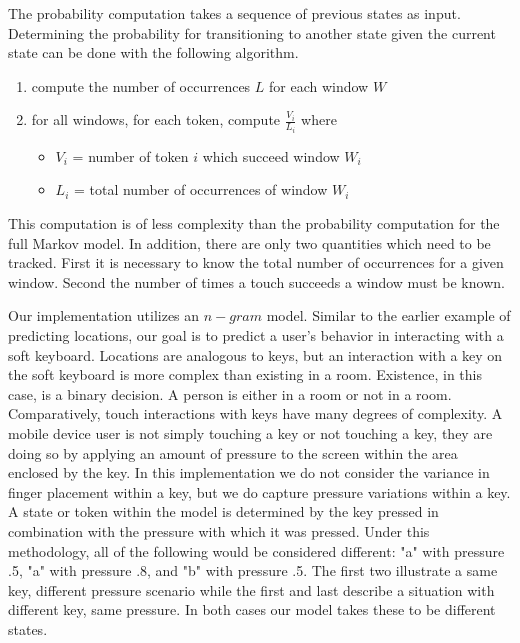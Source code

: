 The probability computation takes a sequence of 
previous states as input.
Determining the probability for transitioning to
another state given the current state can be done
with the following algorithm.
\begin{enumerate}
\item compute the number of occurrences $L$ for each window $W$
\item for all windows, for each token, compute $\frac{V_i}{L_i}$ where
  \begin{itemize} 
  \item $V_i$ = number of token $i$ which succeed window $W_i$
  \item $L_i$ = total number of occurrences of window $W_i$
  \end{itemize}
\end{enumerate}
This computation is of less complexity than 
the probability computation for the full Markov model.
In addition,
there are only two quantities which need to be tracked.
First it is necessary to know the total number of occurrences
for a given window.
Second the number of times a touch succeeds a window must be known. 

Our implementation utilizes an $n-gram$ model.
Similar to the earlier example of predicting locations,
our goal is to predict a user's behavior in
interacting with a soft keyboard.
Locations are analogous to keys, but
an interaction with a key on the soft keyboard is 
more complex than 
existing in a room.
%
Existence, in this case, is a binary decision.
A person is either in a room or not in a room.
Comparatively, touch interactions with keys have
many degrees of complexity.
A mobile device user is not simply
touching a key or not touching a key,
they are doing so by applying an amount of pressure to the screen
within the area enclosed by the key.
%
In this implementation we do not consider the variance 
in finger placement within a key,
but we do capture pressure variations within a key. 
%
A state or token within the model is
determined by the key pressed in combination with
the pressure with which it was pressed.
Under this methodology,
all of the following would be considered different:
"a" with pressure .5,
"a" with pressure .8, and
"b" with pressure .5.
The first two illustrate a same key, different pressure scenario
while the first and last describe
a situation with different key, same pressure.
In both cases our model takes these to be 
different states.

